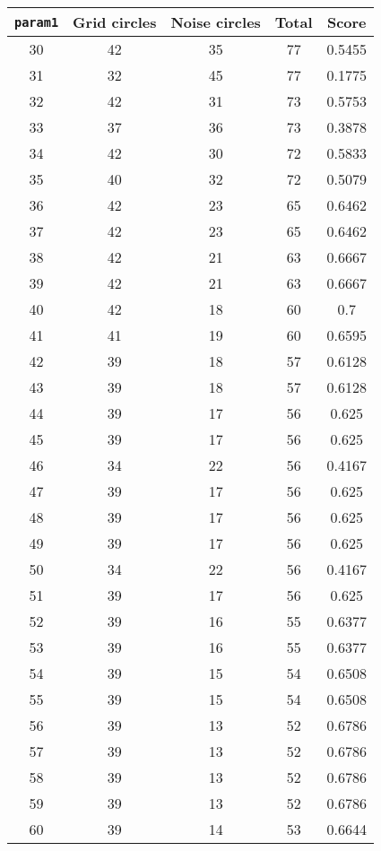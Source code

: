 \documentclass[letterpaper, 12pt]{article}
\begin{document}
\begin{longtable}{|c|c|c|c|c|}
\hline
\textbf{\texttt{param1}} & \textbf{Grid circles} & \textbf{Noise circles} & \textbf{Total} & \textbf{Score} \\
\hline
30 & 42 & 35 & 77 & 0.5455 \\
\hline
31 & 32 & 45 & 77 & 0.1775 \\
\hline
32 & 42 & 31 & 73 & 0.5753 \\
\hline
33 & 37 & 36 & 73 & 0.3878 \\
\hline
34 & 42 & 30 & 72 & 0.5833 \\
\hline
35 & 40 & 32 & 72 & 0.5079 \\
\hline
36 & 42 & 23 & 65 & 0.6462 \\
\hline
37 & 42 & 23 & 65 & 0.6462 \\
\hline
38 & 42 & 21 & 63 & 0.6667 \\
\hline
39 & 42 & 21 & 63 & 0.6667 \\
\hline
40 & 42 & 18 & 60 & 0.7 \\
\hline
41 & 41 & 19 & 60 & 0.6595 \\
\hline
42 & 39 & 18 & 57 & 0.6128 \\
\hline
43 & 39 & 18 & 57 & 0.6128 \\
\hline
44 & 39 & 17 & 56 & 0.625 \\
\hline
45 & 39 & 17 & 56 & 0.625 \\
\hline
46 & 34 & 22 & 56 & 0.4167 \\
\hline
47 & 39 & 17 & 56 & 0.625 \\
\hline
48 & 39 & 17 & 56 & 0.625 \\
\hline
49 & 39 & 17 & 56 & 0.625 \\
\hline
50 & 34 & 22 & 56 & 0.4167 \\
\hline
51 & 39 & 17 & 56 & 0.625 \\
\hline
52 & 39 & 16 & 55 & 0.6377 \\
\hline
53 & 39 & 16 & 55 & 0.6377 \\
\hline
54 & 39 & 15 & 54 & 0.6508 \\
\hline
55 & 39 & 15 & 54 & 0.6508 \\
\hline
56 & 39 & 13 & 52 & 0.6786 \\
\hline
57 & 39 & 13 & 52 & 0.6786 \\
\hline
58 & 39 & 13 & 52 & 0.6786 \\
\hline
59 & 39 & 13 & 52 & 0.6786 \\
\hline
60 & 39 & 14 & 53 & 0.6644 \\

\end{longtable}
\end{document}
